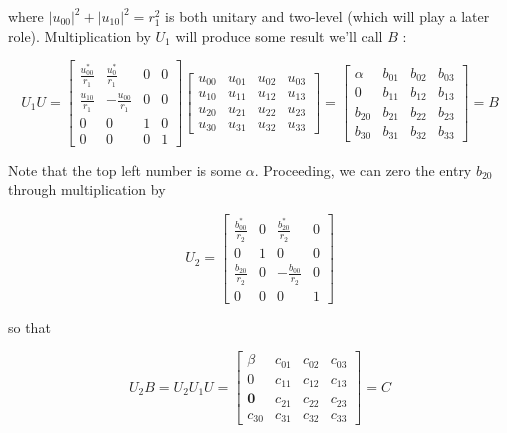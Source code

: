 \documentclass[main.tex]{subfiles}
\begin{document}
    where $\left|u_{00}\right|^{2}+\left|u_{10}\right|^{2}=r_{1}^{2}$ is both unitary and two-level (which will play a later role). Multiplication by $U_{1}$ will produce some result we'll call $B$ :
    
    $$
    U_{1} U=\left[\begin{array}{cccc}
    \frac{u_{00}^{*}}{r_{1}} & \frac{u_{0}^{*}}{r_{1}} & 0 & 0 \\
    \frac{u_{10}}{r_{1}} & -\frac{u_{00}}{r_{1}} & 0 & 0 \\
    0 & 0 & 1 & 0 \\
    0 & 0 & 0 & 1
    \end{array}\right]\left[\begin{array}{llll}
    u_{00} & u_{01} & u_{02} & u_{03} \\
    u_{10} & u_{11} & u_{12} & u_{13} \\
    u_{20} & u_{21} & u_{22} & u_{23} \\
    u_{30} & u_{31} & u_{32} & u_{33}
    \end{array}\right]=\left[\begin{array}{cccc}
    \alpha & b_{01} & b_{02} & b_{03} \\
    0 & b_{11} & b_{12} & b_{13} \\
    b_{20} & b_{21} & b_{22} & b_{23} \\
    b_{30} & b_{31} & b_{32} & b_{33}
    \end{array}\right]=B
    $$
    
    Note that the top left number is some $\alpha$. Proceeding, we can zero the entry $b_{20}$ through multiplication by
    
    $$
    U_{2}=\left[\begin{array}{cccc}
    \frac{b_{00}^{*}}{r_{2}} & 0 & \frac{b_{20}^{*}}{r_{2}} & 0 \\
    0 & 1 & 0 & 0 \\
    \frac{b_{20}}{r_{2}} & 0 & -\frac{b_{00}}{r_{2}} & 0 \\
    0 & 0 & 0 & 1
    \end{array}\right]
    $$
    
    so that
    
    $$
    U_{2} B=U_{2} U_{1} U=\left[\begin{array}{cccc}
    \beta & c_{01} & c_{02} & c_{03} \\
    0 & c_{11} & c_{12} & c_{13} \\
    \mathbf{0} & c_{21} & c_{22} & c_{23} \\
    c_{30} & c_{31} & c_{32} & c_{33}
    \end{array}\right]=C
    $$
    
\end{document}
